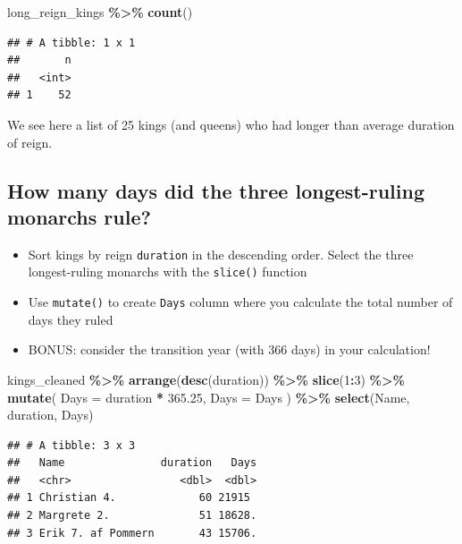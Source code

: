 \documentclass[
]{article}
\newenvironment{Shaded}{\begin{snugshade}}{\end{snugshade}}
\newcommand{\AttributeTok}[1]{\textcolor[rgb]{0.13,0.29,0.53}{#1}}
\newcommand{\DecValTok}[1]{\textcolor[rgb]{0.00,0.00,0.81}{#1}}
\newcommand{\FloatTok}[1]{\textcolor[rgb]{0.00,0.00,0.81}{#1}}
\newcommand{\FunctionTok}[1]{\textcolor[rgb]{0.13,0.29,0.53}{\textbf{#1}}}
\newcommand{\NormalTok}[1]{#1}
\newcommand{\SpecialCharTok}[1]{\textcolor[rgb]{0.81,0.36,0.00}{\textbf{#1}}}
\providecommand{\tightlist}{%
  \setlength{\itemsep}{0pt}\setlength{\parskip}{0pt}}
\begin{document}
\begin{Shaded}
\begin{Highlighting}[]
\NormalTok{long\_reign\_kings }\SpecialCharTok{\%\textgreater{}\%}
  \FunctionTok{count}\NormalTok{()}
\end{Highlighting}
\end{Shaded}

\begin{verbatim}
## # A tibble: 1 x 1
##       n
##   <int>
## 1    52
\end{verbatim}

We see here a list of 25 kings (and queens) who had longer than average
duration of reign.

\subsection{How many days did the three longest-ruling monarchs
rule?}\label{how-many-days-did-the-three-longest-ruling-monarchs-rule}

\begin{itemize}
\tightlist
\item
  Sort kings by reign \texttt{duration} in the descending order. Select
  the three longest-ruling monarchs with the \texttt{slice()} function
\item
  Use \texttt{mutate()} to create \texttt{Days} column where you
  calculate the total number of days they ruled
\item
  BONUS: consider the transition year (with 366 days) in your
  calculation!
\end{itemize}

\begin{Shaded}
\begin{Highlighting}[]
\NormalTok{kings\_cleaned }\SpecialCharTok{\%\textgreater{}\%}
  \FunctionTok{arrange}\NormalTok{(}\FunctionTok{desc}\NormalTok{(duration)) }\SpecialCharTok{\%\textgreater{}\%}    
  \FunctionTok{slice}\NormalTok{(}\DecValTok{1}\SpecialCharTok{:}\DecValTok{3}\NormalTok{) }\SpecialCharTok{\%\textgreater{}\%}                 
  \FunctionTok{mutate}\NormalTok{(}
    \AttributeTok{Days =}\NormalTok{ duration }\SpecialCharTok{*} \FloatTok{365.25}\NormalTok{,}
    \AttributeTok{Days =}\NormalTok{ Days}
\NormalTok{  ) }\SpecialCharTok{\%\textgreater{}\%}
  \FunctionTok{select}\NormalTok{(Name, duration, Days)   }
\end{Highlighting}
\end{Shaded}

\begin{verbatim}
## # A tibble: 3 x 3
##   Name               duration   Days
##   <chr>                 <dbl>  <dbl>
## 1 Christian 4.             60 21915 
## 2 Margrete 2.              51 18628.
## 3 Erik 7. af Pommern       43 15706.
\end{verbatim}
\end{document}
